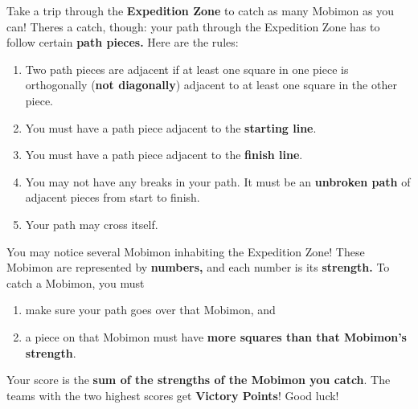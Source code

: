 

Take a trip through the \textbf{Expedition Zone} to catch as many Mobimon as you
can! Theres a catch, though: your path through the Expedition Zone has to follow
certain \textbf{path pieces.} Here are the rules:
\begin{enumerate}
\item Two path pieces are adjacent if at least one square in one piece is
  orthogonally (\textbf{not diagonally}) adjacent to at least one square in the
  other piece.
\item You must have a path piece adjacent to the \textbf{starting line}.
\item You must have a path piece adjacent to the \textbf{finish line}.
\item You may not have any breaks in your path. It must be an \textbf{unbroken
    path} of adjacent pieces from start to finish.
\item Your path may cross itself.
\end{enumerate}

You may notice several Mobimon inhabiting the Expedition Zone! These Mobimon are
represented by \textbf{numbers,} and each number is its \textbf{strength.} To
catch a Mobimon, you must

\begin{enumerate}
\item make sure your path goes over that Mobimon, and
\item a piece on that Mobimon must have \textbf{more squares than that Mobimon's
  strength}.
\end{enumerate}

Your score is the \textbf{sum of the strengths of the Mobimon you catch}. The
teams with the two highest scores get \textbf{Victory Points}! Good luck!

\newpage


